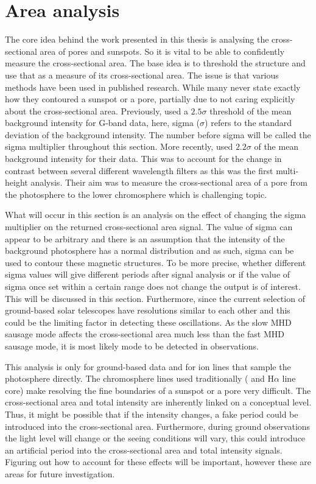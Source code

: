 \section{Area analysis}

	The core idea behind the work presented in this thesis is analysing the cross-sectional area of pores and sunspots.
	So it is vital to be able to confidently measure the cross-sectional area.
    The base idea is to threshold the structure and use that as a measure of its cross-sectional area.
    The issue is that various methods have been used in published research.
    While many never state exactly how they contoured a sunspot or a pore, partially due to not caring explicitly about the cross-sectional area.
    Previously, \cite{morton2011} used a $2.5\sigma$ threshold of the mean background intensity for G-band data, here, sigma ($\sigma$) refers to the standard deviation of the background intensity.
    The number before sigma will be called the sigma multiplier throughout this section.
	More recently, \cite{0004-637X-806-1-132} used $2.2\sigma$ of the mean background intensity for their data.
    This was to account for the change in contrast between several different wavelength filters as this was the first multi-height analysis.
    Their aim was to measure the cross-sectional area of a pore from the photosphere to the lower chromosphere which is challenging topic.
	
	What will occur in this section is an analysis on the effect of changing the sigma multiplier on the returned cross-sectional area signal.
    The value of sigma can appear to be arbitrary and there is an assumption that the intensity of the background photosphere has a normal distribution and as such, sigma can be used to contour these magnetic structures.
    To be more precise, whether different sigma values will give different periods after signal analysis or if the value of sigma once set within a certain range does not change the output is of interest.
    This will be discussed in this section.
    Furthermore, since the current selection of ground-based solar telescopes have resolutions similar to each other and this could be the limiting factor in detecting these oscillations.
    As the slow MHD sausage mode affects the cross-sectional area much less than the fast MHD sausage mode, it is most likely mode to be detected in observations.
    
	This analysis is only for ground-based data and for ion lines that sample the photosphere directly.
	The chromosphere lines used traditionally ( and H$\alpha$ line core) make resolving the fine boundaries of a sunspot or a pore very difficult.
	The cross-sectional area and total intensity are inherently linked on a conceptual level.
	Thus, it might be possible that if the intensity changes, a fake period could be introduced into the cross-sectional area.
    Furthermore, during ground observations the light level will change or the seeing conditions will vary, this could introduce an artificial period into the cross-sectional area and total intensity signals.
    Figuring out how to account for these effects will be important, however these are areas for future investigation.
    
